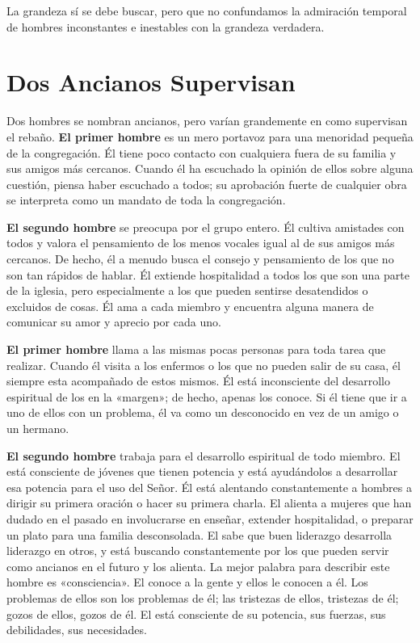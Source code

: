 \documentclass[12pt, twoside, openright]{book}
\begin{document}
La grandeza sí se debe buscar, pero que no confundamos la admiración temporal de hombres inconstantes e inestables con la grandeza verdadera. 

\section{Dos Ancianos Supervisan}
Dos hombres se nombran ancianos, pero varían grandemente en como supervisan el rebaño. \textbf{El primer hombre} es un mero portavoz para una menoridad pequeña de la congregación. Él tiene poco contacto con cualquiera fuera de su familia y sus amigos más cercanos. Cuando él ha escuchado la opinión de ellos sobre alguna cuestión, piensa haber escuchado a todos; su aprobación fuerte de cualquier obra se interpreta como un mandato de toda la congregación. 

\textbf{El segundo hombre} se preocupa por el grupo entero. Él cultiva amistades con todos y valora el pensamiento de los menos vocales igual al de sus amigos más cercanos. De hecho, él a menudo busca el consejo y pensamiento de los que no son tan rápidos de hablar. Él extiende hospitalidad a todos los que son una parte de la iglesia, pero especialmente a los que pueden sentirse desatendidos o excluidos de cosas. Él ama a cada miembro y encuentra alguna manera de comunicar su amor y aprecio por cada uno. 

\textbf{El primer hombre} llama a las mismas pocas personas para toda tarea que realizar. Cuando él visita a los enfermos o los que no pueden salir de su casa, él siempre esta acompañado de estos mismos. Él está inconsciente del desarrollo espiritual de los en la «margen»; de hecho, apenas los conoce. Si él tiene que ir a uno de ellos con un problema, él va como un desconocido en vez de un amigo o un hermano. 

\textbf{El segundo hombre} trabaja para el desarrollo espiritual de todo miembro. El está consciente de jóvenes que tienen potencia y está ayudándolos a desarrollar esa potencia para el uso del Señor. Él está alentando constantemente a hombres a dirigir su primera oración o hacer su primera charla. El alienta a mujeres que han dudado en el pasado en involucrarse en enseñar, extender hospitalidad, o preparar un plato para una familia desconsolada. El sabe que buen liderazgo desarrolla liderazgo en otros, y está buscando constantemente por los que pueden servir como ancianos en el futuro y los alienta. La mejor palabra para describir este hombre es «consciencia». El conoce a la gente y ellos le conocen a él. Los problemas de ellos son los problemas de él; las tristezas de ellos, tristezas de él; gozos de ellos, gozos de él. El está consciente de su potencia, sus fuerzas, sus debilidades, sus necesidades. 
\end{document}
